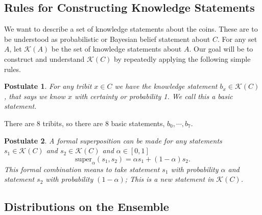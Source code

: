 \documentclass[12pt,a4paper]{article}
\theoremstyle{myrule}
\theoremstyle{postulate}
\newtheorem{postulate}{Postulate}[section]
\theoremstyle{definition}
\begin{document}
\subsection{Rules for Constructing Knowledge Statements}
We want to describe a set of knowledge statements about the coins.  These are to be understood as probabilistic or Bayesian belief statement about $C$.   For any set $A$, let $\mathcal{K}(A)$ be the set of knowledge statements about $A$.  Our goal will be to construct and understand $\mathcal{K}(C)$ by repeatedly applying the following simple rules.
\begin{postulate}
\label{rule1}
For any tribit $x \in C$ we have the knowledge statement $b_x \in \mathcal{K}(C)$, that says we know $x$ with certainty or probability 1.  We call this a basic statement.
\end{postulate}
There are 8 tribits, so there are 8 basic statements, $b_\mathit{0},\cdots,b_\mathit{7}$.
\begin{postulate}
 \label{rule2}
  A formal superposition can be made for any statements $s_1 \in \mathcal{K}(C)$ and $s_2 \in \mathcal{K}(C)$ and $\alpha \in [0,1]$
  \begin{equation}
  \label{super}
  \text{super}_\alpha(s_1,s_2) = \alpha s_1 + (1 -\alpha) s_2.
  \end{equation}
This formal combination means to take statement $s_1$ with probability $\alpha$ and statement $s_2$ with probability $(1-\alpha)$; This is a new statement in $ \mathcal{K}(C)$.
\end{postulate}

\subsection{Distributions on the Ensemble}
\end{document}
